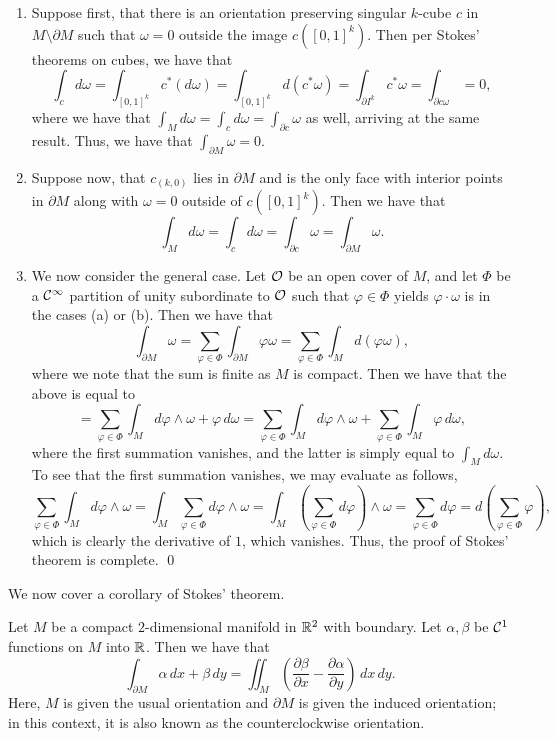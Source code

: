\begin{enumerate}[label=(\alph*)]
    \item Suppose first, that there is an orientation preserving singular $k$-cube $c$ in $M \setminus \partial M$ such that $\omega = 0$ outside the image $c([0, 1]^k)$. Then per Stokes' theorems on cubes, we have that
    \[ \int_c d\omega = \int_{[0, 1]^k} c^\ast(d\omega) = \int_{[0, 1]^k} d(c^\ast \omega) = \int_{\partial I^k} c^\ast \omega = \int_{\partial c \omega} = 0, \]
    where we have that $\int_M d\omega = \int_c d\omega = \int_{\partial c} \omega$ as well, arriving at the same result. Thus, we have that $\int_{\partial M} \omega = 0$.
    \item Suppose now, that $c_{(k, 0)}$ lies in $\partial M$ and is the only face with interior points in $\partial M$ along with $\omega = 0$ outside of $c([0, 1]^k)$. Then we have that 
    \[ \int_M d\omega = \int_c d\omega = \int_{\partial c} \omega = \int_{\partial M} \omega. \]
    \item We now consider the general case. Let $\mathcal O$ be an open cover of $M$, and let $\Phi$ be a $\mathcal C^\infty$ partition of unity subordinate to $\mathcal O$ such that $\varphi \in \Phi$ yields $\varphi \cdot \omega$ is in the cases (a) or (b). Then we have that
    \[ \int_{\partial M} \omega = \sum_{\varphi \in \Phi} \int_{\partial M} \varphi \omega = \sum_{\varphi \in \Phi} \int_M d(\varphi \omega), \]
    where we note that the sum is finite as $M$ is compact. Then we have that the above is equal to
    \[ = \sum_{\varphi \in \Phi} \int_M d\varphi \wedge \omega + \varphi \, d\omega = \sum_{\varphi \in \Phi} \int_M d\varphi \wedge \omega + \sum_{\varphi \in \Phi} \int_M \varphi \, d\omega, \]
    where the first summation vanishes, and the latter is simply equal to $\int_M d\omega$. To see that the first summation vanishes, we may evaluate as follows,
    \[ \sum_{\varphi \in \Phi} \int_M d\varphi \wedge \omega = \int_M \sum_{\varphi \in \Phi} d\varphi \wedge \omega = \int_M \left(\sum_{\varphi \in \Phi} d\varphi\right) \wedge \omega = \sum_{\varphi \in \Phi} d\varphi = d\left(\sum_{\varphi \in \Phi} \varphi\right), \]
    which is clearly the derivative of $1$, which vanishes. Thus, the proof of Stokes' theorem is complete. \qed
\end{enumerate}
We now cover a corollary of Stokes' theorem.
\begin{simplethm}
    Let $M$ be a compact $2$-dimensional manifold in $\mathbb R^2$ with boundary. Let $\alpha, \beta$ be $\mathcal C^1$ functions on $M$ into $\mathbb R$. Then we have that
    \[ \int_{\partial M} \alpha \, dx + \beta \, dy = \iint_M \left(\frac{\partial \beta}{\partial x} - \frac{\partial \alpha}{\partial y}\right) \, dx \, dy. \]
    Here, $M$ is given the usual orientation and $\partial M$ is given the induced orientation; in this context, it is also known as the counterclockwise orientation.
\end{simplethm}
